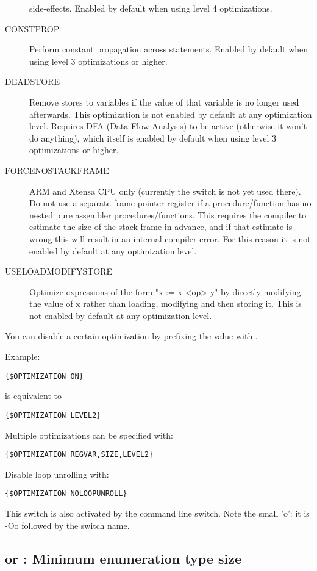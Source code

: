 \begin{description}
side-effects.  Enabled by default when using level 4 optimizations.
\item[CONSTPROP]  Perform constant propagation across statements. Enabled by default when using level
3 optimizations or higher.
\item[DEADSTORE] Remove stores to variables if the value of that variable is no longer
used afterwards. This optimization is not enabled by default at any optimization level.
Requires DFA (Data Flow Analysis) to be active (otherwise it won't do anything), which itself
is enabled by default when using level 3 optimizations or higher.
\item[FORCENOSTACKFRAME]  ARM and Xtensa CPU only (currently the switch is
not yet used there). Do not use a separate frame pointer register if a
procedure/function has no nested pure assembler procedures/functions.
This requires the compiler to estimate the size of the stack frame in
advance, and if that estimate is wrong this will result in an internal
compiler error. For this reason it is not enabled by default at any optimization level.
\item[USELOADMODIFYSTORE] Optimize expressions of the form "x := x <op> y" by directly modifying
the value of x rather than loading, modifying and then storing it. This is
not enabled by default at any optimization level.
\end{description}
You can disable a certain optimization by prefixing the value with .

Example:
\begin{verbatim}
{$OPTIMIZATION ON}
\end{verbatim}
is equivalent to 
\begin{verbatim}
{$OPTIMIZATION LEVEL2}
\end{verbatim}
Multiple optimizations can be specified with:
\begin{verbatim}
{$OPTIMIZATION REGVAR,SIZE,LEVEL2}
\end{verbatim}
Disable loop unrolling with:
\begin{verbatim}
{$OPTIMIZATION NOLOOPUNROLL}
\end{verbatim}

This switch is also activated by the  command line switch.
Note the small 'o': it is -Oo followed by the switch name.

\subsection{ or  : Minimum enumeration type size}
\label{se:Packenum}

